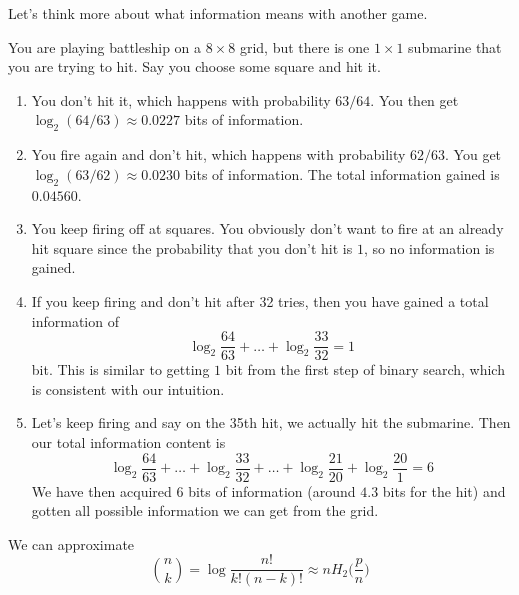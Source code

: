   Let's think more about what information means with another game. 

  \begin{example}[Submarines]
    \label{ex:submarines}
    You are playing battleship on a $8 \times 8$ grid, but there is one $1 \times 1$ submarine that you are trying to hit. Say you choose some square and hit it. 
    \begin{enumerate}
      \item You don't hit it, which happens with probability $63/64$. You then get $\log_2 (64/63) \approx 0.0227$ bits of information. 

      \item You fire again and don't hit, which happens with probability $62/63$. You get $\log_2 (63/62) \approx 0.0230$ bits of information. The total information gained is $0.04560$. 

      \item You keep firing off at squares. You obviously don't want to fire at an already hit square since the probability that you don't hit is $1$, so no information is gained. 

      \item If you keep firing and don't hit after 32 tries, then you have gained a total information of 
      \begin{equation}
        \log_2 \frac{64}{63} + \ldots + \log_2 \frac{33}{32} = 1
      \end{equation}
      bit. This is similar to getting $1$ bit from the first step of binary search, which is consistent with our intuition. 

      \item Let's keep firing and say on the 35th hit, we actually hit the submarine. Then our total information content is 
      \begin{equation}
        \log_2 \frac{64}{63} + \ldots + \log_2 \frac{33}{32} + \ldots + \log_2 \frac{21}{20} + \log_2 \frac{20}{1} = 6
      \end{equation}
      We have then acquired 6 bits of information (around $4.3$ bits for the hit) and gotten all possible information we can get from the grid. 
    \end{enumerate}
  \end{example}

  \begin{lemma}
    \label{thm:approximation-of-binomial-distribution}
    We can approximate 
    \begin{equation}
      \binom{n}{k} = \log \frac{n!}{k! (n-k)!} \approx n H_2 \bigg( \frac{p}{n} \bigg)
    \end{equation}
  \end{lemma}

